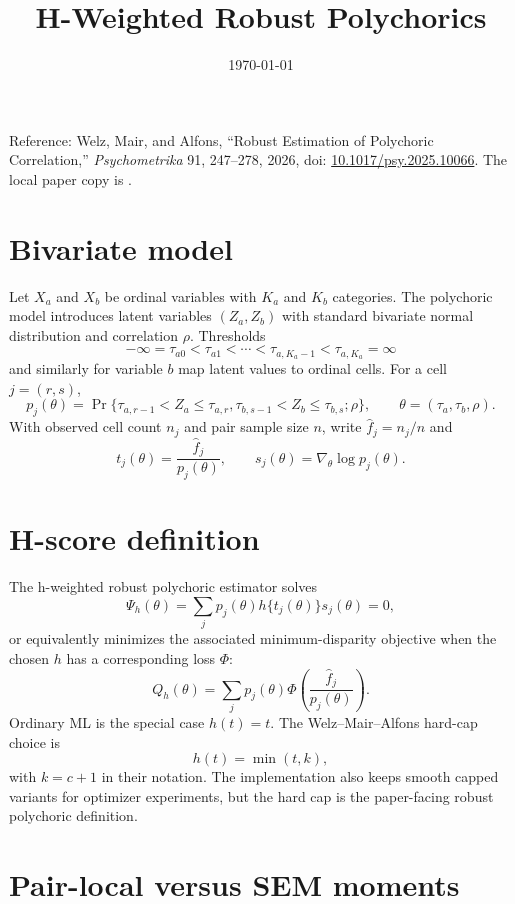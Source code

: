 \documentclass[11pt]{article}
\title{H-Weighted Robust Polychorics}
\author{}
\date{\today}
\newcommand{\fhat}{\widehat f}
\begin{document}
\maketitle

\noindent
Reference: Welz, Mair, and Alfons, ``Robust Estimation of Polychoric
Correlation,'' \emph{Psychometrika} 91, 247--278, 2026,
doi: \href{https://doi.org/10.1017/psy.2025.10066}{10.1017/psy.2025.10066}.
The local paper copy is
.

\section*{Bivariate model}

Let $X_a$ and $X_b$ be ordinal variables with $K_a$ and $K_b$ categories. The
polychoric model introduces latent variables $(Z_a,Z_b)$ with standard
bivariate normal distribution and correlation $\rho$. Thresholds
\[
  -\infty = \tau_{a0} < \tau_{a1} < \cdots < \tau_{a,K_a-1}
  < \tau_{a,K_a} = \infty
\]
and similarly for variable $b$ map latent values to ordinal cells. For a cell
$j=(r,s)$,
\[
  p_j(\theta) =
  \Pr\{\tau_{a,r-1} < Z_a \le \tau_{a,r},
       \tau_{b,s-1} < Z_b \le \tau_{b,s}; \rho\},
  \qquad
  \theta = (\tau_a,\tau_b,\rho).
\]
With observed cell count $n_j$ and pair sample size $n$, write
$\fhat_j=n_j/n$ and
\[
  t_j(\theta) = \frac{\fhat_j}{p_j(\theta)}, \qquad
  s_j(\theta) = \nabla_\theta \log p_j(\theta).
\]

\section*{H-score definition}

The h-weighted robust polychoric estimator solves
\[
  \Psi_h(\theta)
  =
  \sum_j p_j(\theta) h\{t_j(\theta)\} s_j(\theta)
  = 0,
\]
or equivalently minimizes the associated minimum-disparity objective when the
chosen $h$ has a corresponding loss $\Phi$:
\[
  Q_h(\theta)
  =
  \sum_j p_j(\theta)
  \Phi\!\left(\frac{\fhat_j}{p_j(\theta)}\right).
\]
Ordinary ML is the special case $h(t)=t$. The Welz--Mair--Alfons hard-cap
choice is
\[
  h(t) = \min(t,k),
\]
with $k=c+1$ in their notation. The implementation also keeps smooth capped
variants for optimizer experiments, but the hard cap is the paper-facing
robust polychoric definition.

\section*{Pair-local versus SEM moments}
\end{document}

